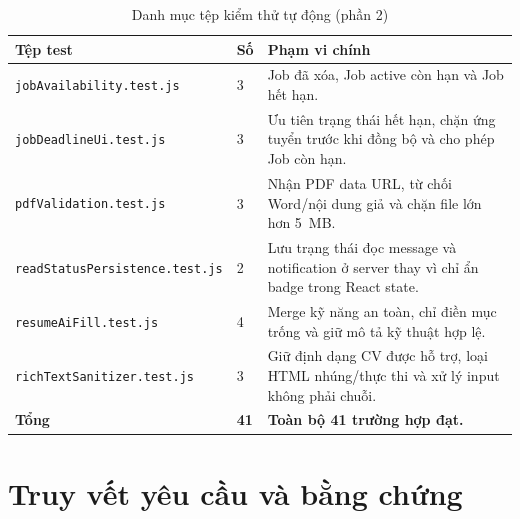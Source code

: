 \begin{table}[H]
    \centering
    \footnotesize
    \begin{tabularx}{\textwidth}{|p{}|p{}|Y|} \hline
        \textbf{Tệp test} & \textbf{Số} & \textbf{Phạm vi chính} \\ \hline
        \texttt{jobAvailability.test.js} & 3 & Job đã xóa, Job active còn hạn và Job hết hạn. \\ \hline
        \texttt{jobDeadlineUi.test.js} & 3 & Ưu tiên trạng thái hết hạn, chặn ứng tuyển trước khi đồng bộ và cho phép Job còn hạn. \\ \hline
        \texttt{pdfValidation.test.js} & 3 & Nhận PDF data URL, từ chối Word/nội dung giả và chặn file lớn hơn 5~MB. \\ \hline
        \texttt{readStatus}\allowbreak\texttt{Persistence.test.js} & 2 & Lưu trạng thái đọc message và notification ở server thay vì chỉ ẩn badge trong React state. \\ \hline
        \texttt{resumeAiFill.test.js} & 4 & Merge kỹ năng an toàn, chỉ điền mục trống và giữ mô tả kỹ thuật hợp lệ. \\ \hline
        \texttt{richTextSanitizer.test.js} & 3 & Giữ định dạng CV được hỗ trợ, loại HTML nhúng/thực thi và xử lý input không phải chuỗi. \\ \hline
        \textbf{Tổng} & \textbf{41} & \textbf{Toàn bộ 41 trường hợp đạt.} \\ \hline
    \end{tabularx}
    \caption{Danh mục tệp kiểm thử tự động (phần 2)}
    \label{tab:test-inventory}
\end{table}

\section{Truy vết yêu cầu và bằng chứng}

